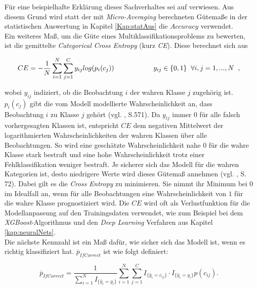 \documentclass[a4paper,11pt]{article}
\begin{document}
Für eine beispielhafte Erklärung dieses Sachverhaltes sei auf \cite{towards1}
verwiesen. Aus diesem Grund wird statt der mit \textit{Micro-Averaging} berechneten Gütemaße in der statistischen Auswertung in Kapitel \ref{Kap:statAus} die $Accuracy$ verwendet.\\

Ein weiteres Maß, um die Güte eines Multiklassifikationsproblems zu bewerten, ist die gemittelte \textit{Categorical Cross Entropy} (kurz \textit{CE}). Diese berechnet sich aus

\[ CE = - \frac{1}{N}\sum_{i=1}^N \sum_{j = 1}^C y_{ij} log(p_i(c_j)) \hspace{2cm} y_{ij} \in \{0,1\} \hspace{0.2cm} \forall i, j = 1,...,N \hspace{0.2cm} ,\]

wobei $y_{ij}$ indiziert, ob die Beobachtung $i$ der wahren Klasse $j$ zugehörig ist. $p_i(c_j)$ gibt die vom Modell modellierte Wahrscheinlichkeit an, dass Beobachtung $i$ zu Klasse $j$ gehört (vgl. \cite{murphy}, S.571). Da $y_{ij}$ immer $0$ für alle falsch vorhergesagten Klassen ist, entspricht $CE$ dem negativen Mittelwert der logarithmierten Wahrscheinlichkeiten der wahren Klassen über alle Beobachtungen. So wird eine geschätzte Wahrscheinlichkeit nahe $0$ für die wahre Klasse stark bestraft und eine hohe Wahrscheinlichkeit trotz einer Fehlklassifikation weniger bestraft. Je sicherer sich das Modell für die wahren Kategorien ist, desto niedrigere Werte wird dieses Gütemaß annehmen (vgl. \cite{proMachine}, S. 72). 
Dabei gilt es die \textit{Cross Entropy} zu minimieren. Sie nimmt ihr Minimum bei $0$ im Idealfall an, wenn für alle Beobachtungen eine Wahrscheinlichkeit von $1$ für die wahre Klasse prognostiziert wird. Die $CE$ wird oft als Verlustfunktion für die Modellanpassung auf den Trainingsdaten verwendet, wie zum Beispiel bei dem \textit{XGBoost}-Algorithmus und den \textit{Deep Learning} Verfahren aus Kapitel \ref{kap:neuralNets}. \\
Die nächste Kennzahl ist ein Maß dafür, wie sicher sich das Modell ist, wenn es richtig klassifiziert hat. $\bar{p}_{IfCorrect}$ ist wie folgt definiert:

\[\bar{p}_{IfCorrect} = \frac{1}{\sum_{i=1}^N I_{\{\hat{y}_i = y_i\}}}\sum_{i=1}^N \sum_{j=1}^C I_{\{\hat{y}_i = c_{ij}\}} \cdot I_{\{\hat{y}_i = y_i\}} p(c_{ij}). \]
\end{document}
